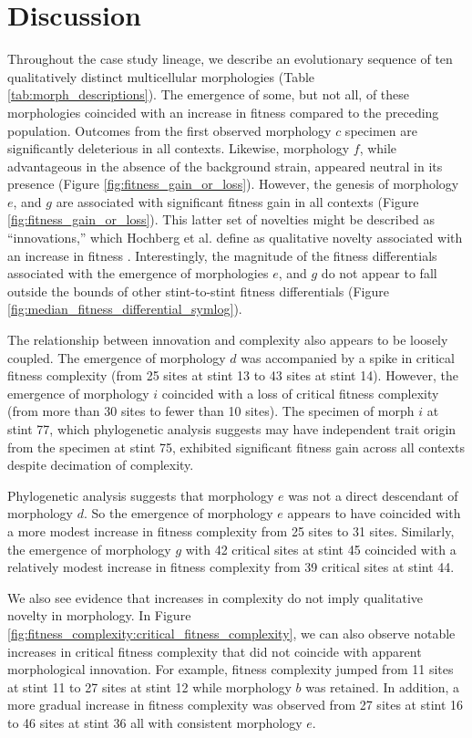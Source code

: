 \section{Discussion}

Throughout the case study lineage, we describe an evolutionary sequence of ten qualitatively distinct multicellular morphologies (Table \ref{tab:morph_descriptions}).
The emergence of some, but not all, of these morphologies coincided with an increase in fitness compared to the preceding population.
Outcomes from the first observed morphology $c$ specimen are significantly deleterious in all contexts.
Likewise, morphology $f$, while advantageous in the absence of the background strain, appeared neutral in its presence (Figure \ref{fig:fitness_gain_or_loss}).
However, the genesis of morphology $e$, and $g$ are associated with significant fitness gain in all contexts (Figure \ref{fig:fitness_gain_or_loss}).
This latter set of novelties might be described as ``innovations,'' which Hochberg et al. define as qualitative novelty associated with an increase in fitness \citep{hochberg2017innovation}.
Interestingly, the magnitude of the fitness differentials associated with the emergence of morphologies $e$, and $g$ do not appear to fall outside the bounds of other stint-to-stint fitness differentials (Figure \ref{fig:median_fitness_differential_symlog}).

The relationship between innovation and complexity also appears to be loosely coupled.
The emergence of morphology $d$ was accompanied by a spike in critical fitness complexity (from 25 sites at stint 13 to 43 sites at stint 14).
However, the emergence of morphology $i$ coincided with a loss of critical fitness complexity (from more than 30 sites to fewer than 10 sites).
The specimen of morph $i$ at stint 77, which phylogenetic analysis suggests may have independent trait origin from the specimen at stint 75, exhibited significant fitness gain across all contexts despite decimation of complexity.

Phylogenetic analysis suggests that morphology $e$ was not a direct descendant of morphology $d$.
So the emergence of morphology $e$ appears to have coincided with a more modest increase in fitness complexity from 25 sites to 31 sites.
Similarly, the emergence of morphology $g$ with 42 critical sites at stint 45 coincided with a relatively modest increase in fitness complexity from 39 critical sites at stint 44.

We also see evidence that increases in complexity do not imply qualitative novelty in morphology.
In Figure \ref{fig:fitness_complexity:critical_fitness_complexity}, we can also observe notable increases in critical fitness complexity that did not coincide with apparent morphological innovation.
For example, fitness complexity jumped from 11 sites at stint 11 to 27 sites at stint 12 while morphology $b$ was retained.
In addition, a more gradual increase in fitness complexity was observed from 27 sites at stint 16 to 46 sites at stint 36 all with consistent morphology $e$.

